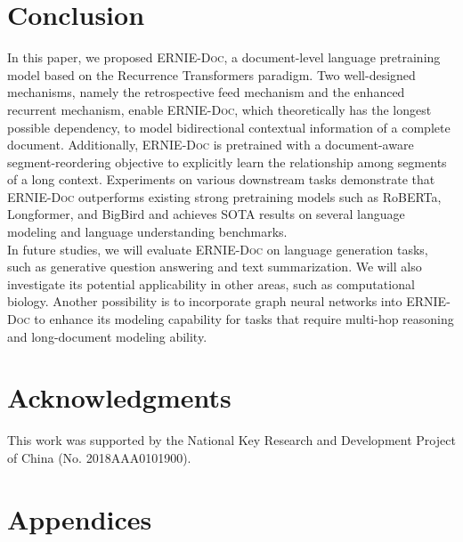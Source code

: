 \documentclass[11pt,a4paper]{article}
\newcommand{\mname}{\textsc{ERNIE-Doc}\xspace}
\begin{document}
\section{Conclusion}
In this paper, we proposed \mname, a document-level language pretraining model based on the Recurrence Transformers paradigm. Two well-designed mechanisms, namely the retrospective feed mechanism and the enhanced recurrent mechanism, enable \mname, which theoretically has the longest possible dependency, to model bidirectional contextual information of a complete document. Additionally, \mname is pretrained with a document-aware segment-reordering objective to explicitly learn the relationship among segments of a long context. Experiments on various downstream tasks demonstrate that \mname outperforms existing strong pretraining models such as RoBERTa, Longformer, and BigBird and achieves 
SOTA results on several language modeling and language understanding benchmarks.\\
In future studies, we will evaluate \mname on language generation tasks, such as generative question answering and text summarization. We will also investigate its potential applicability in other areas, such as computational biology. Another possibility is to incorporate graph neural networks into \mname to enhance its modeling capability for tasks that require multi-hop reasoning and long-document modeling ability.


\section*{Acknowledgments}
This work was supported by the National Key Research and Development Project of China (No. 2018AAA0101900).






\newpage

\appendix
\section{Appendices}
\label{sec:appendix}
\end{document}
